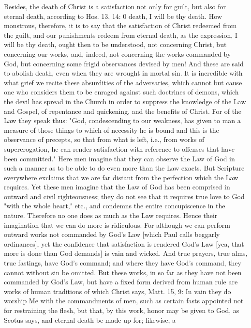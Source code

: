 Besides, the death of Christ is a satisfaction not only for guilt,
but also for eternal death, according to Hos. 13, 14: 0 death, I will
be thy death.  How monstrous, therefore, it is to say that the
satisfaction of Christ redeemed from the guilt, and our punishments
redeem from eternal death, as the expression, I will be thy death,
ought then to be understood, not concerning Christ, but concerning
our works, and, indeed, not concerning the works commanded by God,
but concerning some frigid observances devised by men!  And these are
said to abolish death, even when they are wrought in mortal sin.  It
is incredible with what grief we recite these absurdities of the
adversaries, which cannot but cause one who considers them to be
enraged against such doctrines of demons, which the devil has spread
in the Church in order to suppress the knowledge of the Law and
Gospel, of repentance and quickening, and the benefits of Christ.
For of the Law they speak thus: "God, condescending to our weakness,
has given to man a measure of those things to which of necessity he
is bound and this is the observance of precepts, so that from what is
left, i.e., from works of supererogation, he can render satisfaction
with reference to offenses that have been committed." Here men
imagine that they can observe the Law of God in such a manner as to
be able to do even more than the Law exacts.  But Scripture
everywhere exclaims that we are far distant from the perfection which
the Law requires.  Yet these men imagine that the Law of God has been
comprised in outward and civil righteousness; they do not see that it
requires true love to God "with the whole heart," etc., and condemns
the entire concupiscence in the nature.  Therefore no one does as
much as the Law requires.  Hence their imagination that we can do
more is ridiculous.  For although we can perform outward works not
commanded by God's Law [which Paul calls beggarly ordinances], yet
the confidence that satisfaction is rendered God's Law [yea, that
more is done than God demands] is vain and wicked.  And true prayers,
true alms, true fastings, have God's command; and where they have
God's command, they cannot without sin be omitted.  But these works,
in so far as they have not been commanded by God's Law, but have a
fixed form derived from human rule are works of human traditions of
which Christ says, Matt. 15, 9: In vain they do worship Me with the
commandments of men, such as certain fasts appointed not for
restraining the flesh, but that, by this work, honor may be given to
God, as Scotus says, and eternal death be made up for; likewise, a
